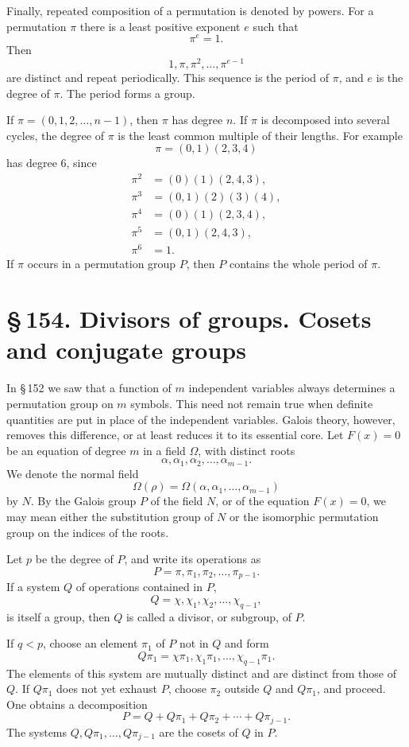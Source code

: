 \documentclass[11pt]{article}
\providecommand{\sect}[2]{\section*{\S\,#1. #2}}
\begin{document}
Finally, repeated composition of a permutation is denoted by powers. For a permutation $\pi$ there is a least positive exponent $e$ such that
\[
        \pi^e=1.
\]
Then
\[
        1,\pi,\pi^2,
\ldots,
\pi^{e-1}
\]
are distinct and repeat periodically. This sequence is the period of $\pi$, and $e$ is the degree of $\pi$. The period forms a group.

If $\pi=(0,1,2,
\ldots,n-1)$, then $\pi$ has degree $n$. If $\pi$ is decomposed into several cycles, the degree of $\pi$ is the least common multiple of their lengths. For example
\[
        \pi=(0,1)(2,3,4)
\]
has degree $6$, since
\[
\begin{aligned}
        \pi^2&=(0)(1)(2,4,3),\\
        \pi^3&=(0,1)(2)(3)(4),\\
        \pi^4&=(0)(1)(2,3,4),\\
        \pi^5&=(0,1)(2,4,3),\\
        \pi^6&=1.
\end{aligned}
\]
If $\pi$ occurs in a permutation group $P$, then $P$ contains the whole period of $\pi$.


\sect{154}{Divisors of groups. Cosets and conjugate groups}

In \S\,152 we saw that a function of $m$ independent variables always determines a permutation group on $m$ symbols. This need not remain true when definite quantities are put in place of the independent variables. Galois theory, however, removes this difference, or at least reduces it to its essential core. Let $F(x)=0$ be an equation of degree $m$ in a field $\Omega$, with distinct roots
\[
        \alpha,\alpha_1,\alpha_2,
\ldots,
\alpha_{m-1}.
\]
We denote the normal field
\[
        \Omega(\rho)=\Omega(\alpha,
\alpha_1,
\ldots,
\alpha_{m-1})
\]
by $N$. By the Galois group $P$ of the field $N$, or of the equation $F(x)=0$, we may mean either the substitution group of $N$ or the isomorphic permutation group on the indices of the roots.

Let $p$ be the degree of $P$, and write its operations as
\[
        P=\pi,\pi_1,
\pi_2,
\ldots,
\pi_{p-1}.
\tag{1}
\]
If a system $Q$ of operations contained in $P$,
\[
        Q=\chi,
\chi_1,
\chi_2,
\ldots,
\chi_{q-1},
\tag{2}
\]
is itself a group, then $Q$ is called a divisor, or subgroup, of $P$.

If $q<p$, choose an element $\pi_1$ of $P$ not in $Q$ and form
\[
        Q\pi_1=\chi\pi_1,
\chi_1\pi_1,
\ldots,
\chi_{q-1}\pi_1.
\tag{3}
\]
The elements of this system are mutually distinct and are distinct from those of $Q$. If $Q\pi_1$ does not yet exhaust $P$, choose $\pi_2$ outside $Q$ and $Q\pi_1$, and proceed. One obtains a decomposition
\[
        P=Q+Q\pi_1+Q\pi_2+\cdots+Q\pi_{j-1}.
\tag{4}
\]
The systems $Q,Q\pi_1,
\ldots,Q\pi_{j-1}$ are the cosets of $Q$ in $P$.
\end{document}
